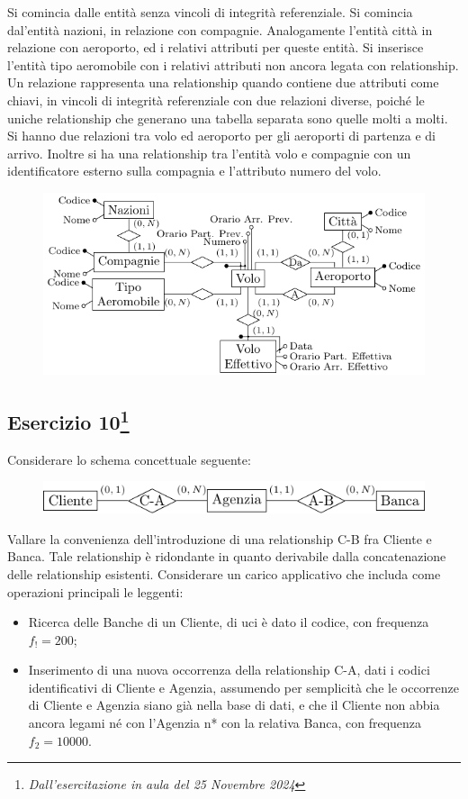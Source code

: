 \documentclass{article}
\begin{document}
Si comincia dalle entità senza vincoli di integrità referenziale. Si comincia dal'entità nazioni, in relazione con compagnie. Analogamente l'entità 
città in relazione con aeroporto, ed i relativi attributi per queste entità. Si inserisce l'entità tipo aeromobile con i relativi attributi non 
ancora legata con relationship. Un relazione rappresenta una relationship quando contiene due attributi come chiavi, in vincoli di integrità 
referenziale con due relazioni diverse, poiché le uniche relationship che generano una tabella separata sono quelle molti a molti. Si hanno due 
relazioni tra volo ed aeroporto per gli aeroporti di partenza e di arrivo. Inoltre si ha una relationship tra l'entità volo e 
compagnie con un identificatore esterno sulla compagnia e l'attributo numero del volo. 

\begin{figure}[H]%
    \centering%
    \includegraphics[scale=1.25]{schema_voli_25-11-24.pdf}%
\end{figure}

\subsection{Esercizio 10\footnote{\textit{Dall'esercitazione in aula del 25 Novembre 2024}}}

Considerare lo schema concettuale seguente:
\begin{figure}[H]%
    \centering
    \includegraphics[scale=1.25]{schema_es_7_25-11-24.pdf}%
\end{figure}

Vallare la convenienza dell'introduzione di una relationship C-B fra Cliente e Banca. Tale relationship è ridondante in quanto derivabile dalla 
concatenazione  delle relationship esistenti. Considerare un carico applicativo che includa come operazioni principali le leggenti:
\begin{itemize}
    \item Ricerca delle Banche di un Cliente, di uci è dato il codice, con frequenza $f_!=200$;
    \item Inserimento di una nuova occorrenza della relationship C-A, dati i codici identificativi di Cliente e Agenzia, assumendo 
    per semplicità che le occorrenze di Cliente e Agenzia siano già nella base di dati, e che il Cliente non 
    abbia ancora legami né con l'Agenzia n* con la relativa Banca, con frequenza $f_2=10000$. 
\end{itemize}
\end{document}
